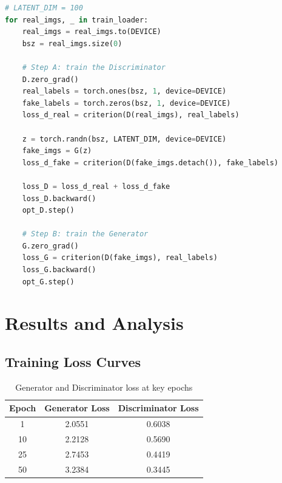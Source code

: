\documentclass[12pt,a4paper]{article}
\begin{document}
\begin{lstlisting}[language=Python, caption=Core training loop]
# LATENT_DIM = 100
for real_imgs, _ in train_loader:
    real_imgs = real_imgs.to(DEVICE)
    bsz = real_imgs.size(0)

    # Step A: train the Discriminator
    D.zero_grad()
    real_labels = torch.ones(bsz, 1, device=DEVICE)
    fake_labels = torch.zeros(bsz, 1, device=DEVICE)
    loss_d_real = criterion(D(real_imgs), real_labels)

    z = torch.randn(bsz, LATENT_DIM, device=DEVICE)
    fake_imgs = G(z)
    loss_d_fake = criterion(D(fake_imgs.detach()), fake_labels)

    loss_D = loss_d_real + loss_d_fake
    loss_D.backward()
    opt_D.step()

    # Step B: train the Generator
    G.zero_grad()
    loss_G = criterion(D(fake_imgs), real_labels)
    loss_G.backward()
    opt_G.step()
\end{lstlisting}

\section{Results and Analysis}

\subsection{Training Loss Curves}

\begin{table}[H]
    \begin{center}
        \begin{tabular}{|c|c|c|}
            \hline
            \textbf{Epoch} & \textbf{Generator Loss} & \textbf{Discriminator Loss} \\
            \hline
            1  & 2.0551 & 0.6038 \\
            \hline
            10 & 2.2128 & 0.5690 \\
            \hline
            25 & 2.7453 & 0.4419 \\
            \hline
            50 & 3.2384 & 0.3445 \\
            \hline
        \end{tabular}
        \caption{Generator and Discriminator loss at key epochs}
        \label{tab:losses}
    \end{center}
\end{table}
\end{document}
